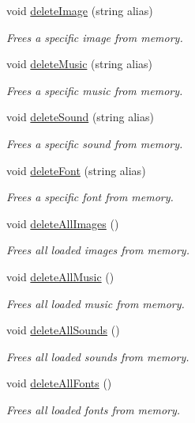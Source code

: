 \begin{CompactItemize}
void \hyperlink{class_resource_mgr_c199d347884e8187eecbcb753cc57391}{deleteImage} (string alias)
\begin{CompactList}\small\item\em Frees a specific image from memory. \item\end{CompactList}\item 
void \hyperlink{class_resource_mgr_bf514587922758b910af8f728e452020}{deleteMusic} (string alias)
\begin{CompactList}\small\item\em Frees a specific music from memory. \item\end{CompactList}\item 
void \hyperlink{class_resource_mgr_fe32796d9e6aad358646f8e9463c77a8}{deleteSound} (string alias)
\begin{CompactList}\small\item\em Frees a specific sound from memory. \item\end{CompactList}\item 
void \hyperlink{class_resource_mgr_5c4a5772b6afa45af23170b0dc53c9d7}{deleteFont} (string alias)
\begin{CompactList}\small\item\em Frees a specific font from memory. \item\end{CompactList}\item 
void \hyperlink{class_resource_mgr_4e46b2808b9ff113d2a3248c9adfe82e}{deleteAllImages} ()
\begin{CompactList}\small\item\em Frees all loaded images from memory. \item\end{CompactList}\item 
void \hyperlink{class_resource_mgr_8e5158a10ed4fb6488e6f4245645c546}{deleteAllMusic} ()
\begin{CompactList}\small\item\em Frees all loaded music from memory. \item\end{CompactList}\item 
void \hyperlink{class_resource_mgr_392062943a324c74e3b4eae021dd0f17}{deleteAllSounds} ()
\begin{CompactList}\small\item\em Frees all loaded sounds from memory. \item\end{CompactList}\item 
void \hyperlink{class_resource_mgr_f32105981599e95feec6b53cb699b8ec}{deleteAllFonts} ()
\begin{CompactList}\small\item\em Frees all loaded fonts from memory. \item\end{CompactList}\end{CompactItemize}
